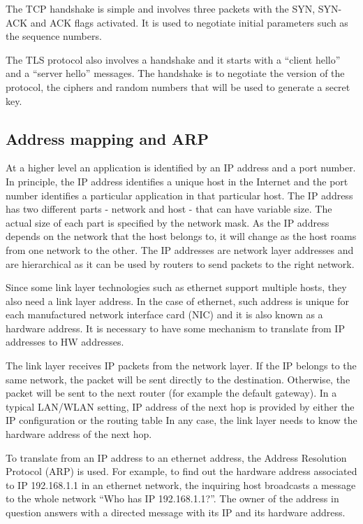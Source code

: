 The TCP handshake is simple and involves three packets with the SYN, SYN-ACK and ACK flags activated.
It is used to negotiate initial parameters such as the sequence numbers.

The TLS protocol also involves a handshake and it starts with a ``client hello'' and a ``server hello'' messages.
The handshake is to negotiate the version of the protocol, the ciphers and random numbers that will be used to generate a secret key.

\subsection{Address mapping and ARP}

At a higher level an application is identified by an IP address and a port number. 
In principle, the IP address identifies a unique host in the Internet and the port number identifies a particular application in that particular host.
The IP address has two different parts - network and host -  that can have variable size.
The actual size of each part is specified by the network mask.
As the IP address depends on the network that the host belongs to, it will change as the host roams from one network to the other.
The IP addresses are network layer addresses and are hierarchical as it can be used by routers to send packets to the right network.

Since some link layer technologies such as ethernet support multiple hosts, they also need a link layer address.
In the case of ethernet, such address is unique for each manufactured network interface card (NIC) and it is also known as a hardware address.
It is necessary to have some mechanism to translate from IP addresses to HW addresses.

The link layer receives IP packets from the network layer.
If the IP belongs to the same network, the packet will be sent directly to the destination.
Otherwise, the packet will be sent to the next router (for example the default gateway).
In a typical LAN/WLAN setting,  IP address of the next hop is provided by either the IP configuration or the routing table
In any case, the link layer needs to know the hardware address of the next hop.

To translate from an IP address to an ethernet address, the Address Resolution Protocol (ARP) is used.
For example, to find out the hardware address associated to IP 192.168.1.1 in an ethernet network, the inquiring host broadcasts a message to the whole network ``Who has IP 192.168.1.1?''.
The owner of the address in question answers with a directed message with its IP and its hardware address.

